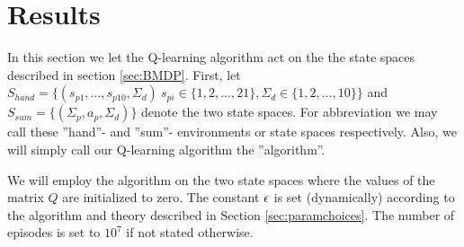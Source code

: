 \section{Results}
In this section we let the Q-learning algorithm act on the the state spaces described in section \ref{sec:BMDP}. First, let $S_{hand}=\{  (s_{p1},\ldots,s_{p10},\Sigma_{d})\ s_{pi} \in \{1,2,\ldots, 21 \}, \Sigma_{d}\in \{1,2,\ldots, 10 \} \}$ and $S_{sum}=\{  (\Sigma_p, a_p, \Sigma_d )  \}$ denote the two state spaces. For abbreviation we may call these ''hand''- and ''sum''- environments or state spaces respectively. Also, we will simply call our Q-learning algorithm the ''algorithm''.

We will employ the algorithm on the two state spaces where the values of the matrix $Q$ are initialized to zero. The constant $\epsilon$ is set (dynamically) according to the algorithm and theory described in Section \ref{sec:paramchoices}. The number of episodes is set to $10^7$ if not stated otherwise. 


